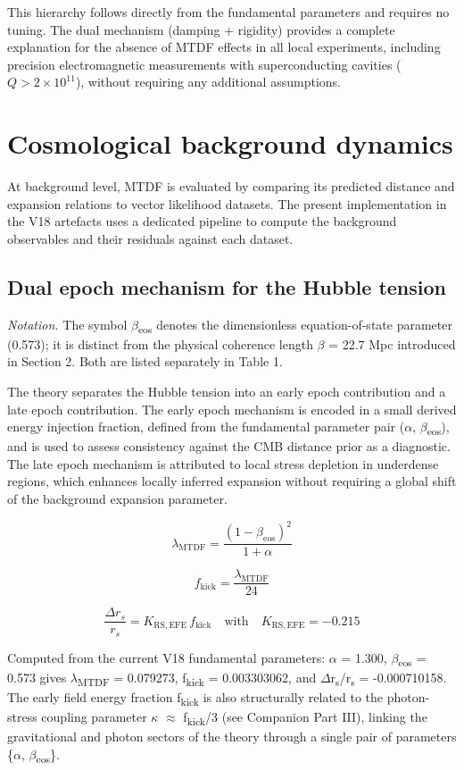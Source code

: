 \documentclass[11pt,a4paper]{article}
\begin{document}
This hierarchy follows directly from the fundamental parameters and requires no tuning. The dual mechanism (damping + rigidity) provides a complete explanation for the absence of MTDF effects in all local experiments, including precision electromagnetic measurements with superconducting cavities (\(Q > 2 \times 10^{11}\)), without requiring any additional assumptions.

\section{Cosmological background dynamics}
\label{sec:sec3}
At background level, MTDF is evaluated by comparing its predicted distance and expansion relations to vector likelihood datasets. The present implementation in the V18 artefacts uses a dedicated pipeline to compute the background observables and their residuals against each dataset.

\subsection{Dual epoch mechanism for the Hubble tension}
\emph{Notation.} The symbol $\beta$\textsubscript{eos} denotes the dimensionless equation-of-state parameter (0.573); it is distinct from the physical coherence length $\beta$ = 22.7 Mpc introduced in Section 2. Both are listed separately in Table 1.

The theory separates the Hubble tension into an early epoch contribution and a late epoch contribution. The early epoch mechanism is encoded in a small derived energy injection fraction, defined from the fundamental parameter pair ($\alpha$, $\beta$\textsubscript{eos}), and is used to assess consistency against the CMB distance prior as a diagnostic. The late epoch mechanism is attributed to local stress depletion in underdense regions, which enhances locally inferred expansion without requiring a global shift of the background expansion parameter.

\[
    \lambda_{\mathrm{MTDF}} = \frac{(1-\beta_{\mathrm{eos}})^2}{1+\alpha}
  \]

\[
    f_{\mathrm{kick}} = \frac{\lambda_{\mathrm{MTDF}}}{24}
  \]

\[
    \frac{\Delta r_s}{r_s} = K_{\mathrm{RS,EFE}} \, f_{\mathrm{kick}} \quad\mathrm{with}\quad K_{\mathrm{RS,EFE}}=-0.215
  \]

Computed from the current V18 fundamental parameters: $\alpha$ = 1.300, $\beta$\textsubscript{eos} = 0.573 gives $\lambda$\textsubscript{MTDF} = 0.079273, f\textsubscript{kick} = 0.003303062, and $\Delta$r\textsubscript{s}/r\textsubscript{s} = -0.000710158. The early field energy fraction f\textsubscript{kick} is also structurally related to the photon-stress coupling parameter $\kappa$ $\approx$ f\textsubscript{kick}/3 (see Companion Part III), linking the gravitational and photon sectors of the theory through a single pair of parameters \{$\alpha$, $\beta$\textsubscript{eos}\}.
\end{document}
